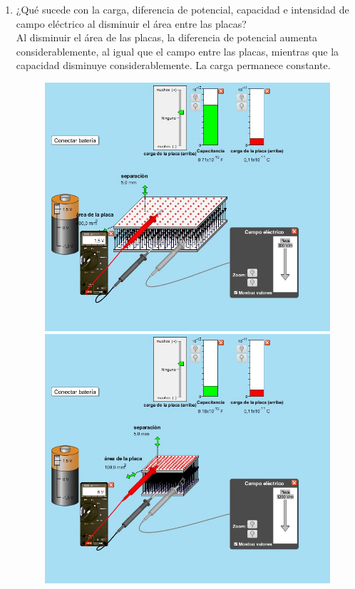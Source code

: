 \documentclass[12pt]{report}
\begin{document}
\begin{enumerate}
\begin{enumerate}
        
  \item ¿Qué sucede con la carga, diferencia de potencial, capacidad e intensidad de campo eléctrico al disminuir el área entre las placas?\\[6pt]
            Al disminuir el área de las placas, la diferencia de potencial aumenta considerablemente, al igual que el campo entre las placas, mientras que la capacidad disminuye considerablemente. La carga permanece constante.\\

      \begin{figure}[h]
          \centering
          \begin{minipage}[h]{0.45\textwidth}
          \centering
          \includegraphics[width=1\textwidth]{./images/3foto4.jpg} 
          \end{minipage}\hfill
          \begin{minipage}[h]{0.45\textwidth}
          \centering
          \includegraphics[width=1\textwidth]{./images/3foto6.jpg} 

\end{minipage}
\end{figure}
\end{enumerate}
\end{enumerate}
\end{document}
